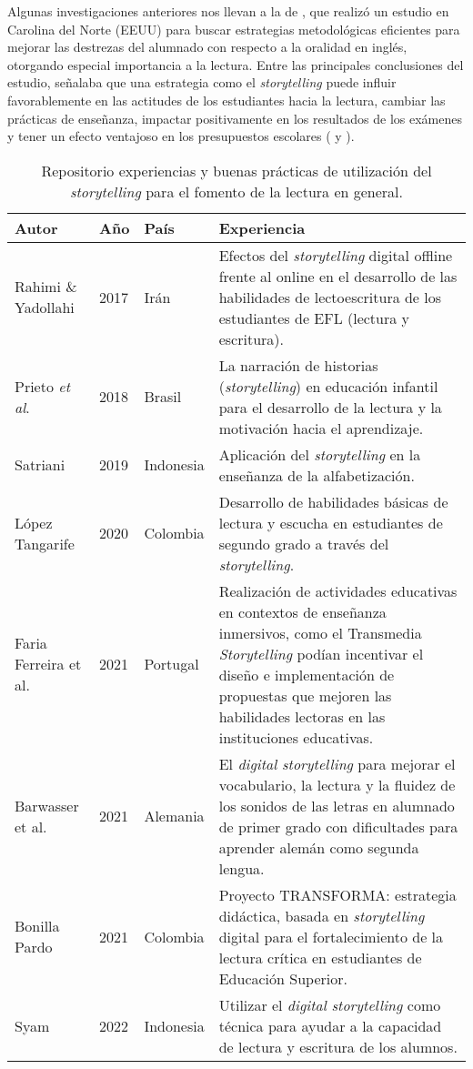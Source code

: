 \documentclass[spanish]{textolivre}
\begin{document}
Algunas investigaciones anteriores nos llevan a la de \textcite{gomez_palacio_strategies_2010}, que realizó un estudio en Carolina del Norte (EEUU) para buscar estrategias metodológicas eficientes para mejorar las destrezas del alumnado con respecto a la oralidad en inglés, otorgando especial importancia a la lectura. Entre las principales conclusiones del estudio, señalaba que una estrategia como el \textit{storytelling} puede influir favorablemente en las actitudes de los estudiantes hacia la lectura, cambiar las prácticas de enseñanza, impactar positivamente en los resultados de los exámenes y tener un efecto ventajoso en los presupuestos escolares ( y ). 

\begin{table}[h!]
\begin{threeparttable}
\caption{Repositorio experiencias y buenas prácticas de utilización del \textit{storytelling} para el fomento de la lectura en general.}
\label{tab01}
\centering
\begin{tabular}{p{} p{1cm} p{2cm} p{7cm}}
\toprule 
\textbf{Autor} & \textbf{Año} & \textbf{País} & \textbf{Experiencia}  \\
\midrule
Rahimi \& Yadollahi & 2017 & Irán & Efectos del \textit{storytelling} digital offline frente al online en el desarrollo de las habilidades de lectoescritura de los estudiantes de EFL (lectura y escritura).  \\
Prieto \textit{et al}. & 2018 & Brasil & La narración de historias (\textit{storytelling}) en educación infantil para el desarrollo de la lectura y la motivación hacia el aprendizaje. \\
Satriani & 2019 & Indonesia & Aplicación del \textit{storytelling} en la enseñanza de la alfabetización. \\
López Tangarife & 2020 & Colombia & Desarrollo de habilidades básicas de lectura y escucha en estudiantes de segundo grado a través del \textit{storytelling}. \\
Faria Ferreira et al. & 2021 & Portugal & Realización de actividades educativas en contextos de enseñanza inmersivos, como el Transmedia \textit{Storytelling} podían incentivar el diseño e implementación de propuestas que mejoren las habilidades lectoras en las instituciones educativas. \\
Barwasser et al. & 2021 & Alemania & El \textit{digital storytelling} para mejorar el vocabulario, la lectura y la fluidez de los sonidos de las letras en alumnado de primer grado con dificultades para aprender alemán como segunda lengua. \\
Bonilla Pardo & 2021 & Colombia & Proyecto TRANSFORMA: estrategia didáctica, basada en \textit{storytelling} digital para el fortalecimiento de la lectura crítica en estudiantes de Educación Superior. \\
Syam & 2022 & Indonesia & Utilizar el \textit{digital storytelling} como técnica para ayudar a la capacidad de lectura y escritura de los alumnos. \\
\bottomrule
\end{tabular}
\end{threeparttable}
\end{table}
\end{document}
